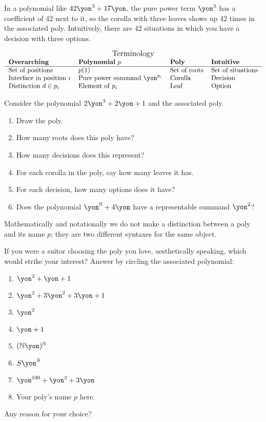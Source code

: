 \documentclass[DynamicalBook]{subfiles}
\begin{document}
In a polynomial like $42\yon^3+17\yon$, the pure power term $\yon^3$ has a coefficient of 42 next to it, so the corolla with three leaves shows up 42 times in the associated poly. Intuitively, there are 42 situations in which you have a decision with three options.

\[
\begin{tabular}{llll}
\multicolumn{4}{c}{\large Terminology}\\
\textbf{Overarching} & \textbf{Polynomial} $p$ & \textbf{Poly} & \textbf{Intuitive}\\\hline
Set of positions & $p(1)$ & Set of roots & Set of situations\\
Interface in position $i$ & Pure power summand $\yon^{p_i}$ & Corolla & Decision\\
Distinction $d\in p_i$ & Element of $p_i$ & Leaf & Option
\end{tabular}
\]

\begin{exercise}
Consider the polynomial $2\yon^3+2\yon+1$ and the associated poly.
\begin{enumerate}
	\item Draw the poly.
	\item How many roots does this poly have?
	\item How many decisions does this represent?
	\item For each corolla in the poly, say how many leaves it has.
	\item For each decision, how many options does it have?
	\item Does the polynomial $\yon^\nn+4\yon$ have a representable summand $\yon^2$?
	\qedhere
\end{enumerate}

\end{exercise}

Mathematically and notationally we do not make a distinction between a poly and its name $p$; they are two different syntaxes for the same object. 


\begin{exercise}
If you were a suitor choosing the poly you love, aesthetically speaking, which would strike your interest? Answer by circling the associated polynomial:
\begin{enumerate}
	\item $\yon^2+\yon+1$
	\item $\yon^2+3\yon^2+3\yon+1$
	\item $\yon^2$
	\item $\yon+1$
	\item $(\nn\yon)^\nn$
	\item $S\yon^S$
	\item $\yon^{100}+\yon^2+3\yon$
	\item Your poly's name $p$ here.
\end{enumerate}
Any reason for your choice?
\end{exercise}
\end{document}
